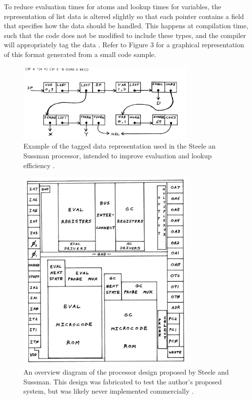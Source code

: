 \documentclass[journal]{IEEEtran}
\begin{document}
To reduce evaluation times for atoms and lookup times for variables, the representation of list data is altered slightly so that each pointer contains a field that specifies how the data should be handled. This happens at compilation time, such that the code does not be modified to include these types, and the compiler will appropriately tag the data \cite{ss}. Refer to Figure 3 for a graphical representation of this format generated from a small code sample.

\begin{figure}[!t]
	\centering
	\includegraphics[width=3.5in]{SS_Data_Representation}
	\caption{Example of the tagged data representation used in the Steele an Sussman processor, intended to improve evaluation and lookup efficiency \cite{ss}.}
	\label{Data representation}
\end{figure}

\begin{figure}[!t]
	\centering
	\includegraphics[width=3.5in]{SS_Processor_Diagram}
	\caption{An overview diagram of the processor design proposed by Steele and Sussman. This design was fabricated to test the author's proposed system, but was likely never implemented commercially \cite{ss}.}
	\label{Data representation}
\end{figure}
\end{document}
